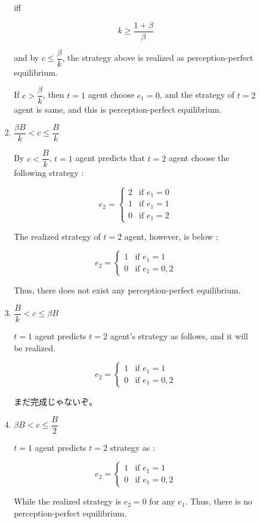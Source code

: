 \documentclass{jsarticle}
\begin{document}
\begin{enumerate}
\begin{enumerate}
\begin{itemize}
\begin{enumerate}
 iff
 
 \[ k \geq \dfrac{1+\beta}{\beta} \]
 
 and by $c \leq \dfrac{\beta}{k}$, the strategy above is realized as perception-perfect equilibrium.
 
 If $c > \dfrac{\beta}{k}$, then $t=1$ agent choose $e_1=0$, and the strategy of $t=2$ agent is same, and this is perception-perfect equilibrium.
 
 \item $ \dfrac{\beta B}{k} < c \leq \dfrac{B}{k} $
 
 By $c < \dfrac{B}{k}$, $t=1$ agent predicts that $t=2$ agent choose the following strategy :
 
 \[e_2 = \begin{cases}
 2 & \text{if } e_1=0 \\
 1 & \text{if } e_1=1 \\
 0 & \text{if } e_1=2
 \end{cases} \]
 
 The realized strategy of $t=2$ agent, however, is below :
 
 \[e_2 = \begin{cases}
  1 & \text{if } e_1=1 \\
 0 & \text{if } e_1=0,2
 \end{cases} \]
 
 Thus, there does not exist any perception-perfect equilibrium.
 
 \item $\dfrac{B}{k} < c \leq \beta B$
 
 $t=1$ agent predicts $t=2$ agent's strategy as follows, and it will be realized.
 
  \[e_2 = \begin{cases}
  1 & \text{if } e_1=1 \\
 0 & \text{if } e_1=0,2
 \end{cases} \]
 
 まだ完成じゃないぞ。
 
 \item $\beta B < c \leq \dfrac{B}{2}$
 
 $t=1$ agent predicts $t=2$ strategy as :
 
  \[e_2 = \begin{cases}
  1 & \text{if } e_1=1 \\
 0 & \text{if } e_1=0,2
 \end{cases} \]
 
 While the realized strategy is $e_2=0$ for any $e_1$. Thus, there is no perception-perfect equilibrium.
 

\end{enumerate}
\end{itemize}
\end{enumerate}
\end{enumerate}
\end{document}
